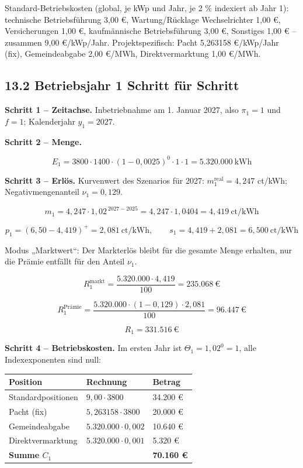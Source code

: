\documentclass[
  a4paper,
  10pt]{article}
\begin{document}
Standard-Betriebskosten (global, je kWp und Jahr, je 2 \% indexiert ab
Jahr 1): technische Betriebsführung 3,00 €, Wartung/Rücklage
Wechselrichter 1,00 €, Versicherungen 1,00 €, kaufmännische
Betriebsführung 3,00 €, Sonstiges 1,00 € -- zusammen 9,00 €/kWp/Jahr.
Projektspezifisch: Pacht 5,263158 €/kWp/Jahr (fix), Gemeindeabgabe 2,00
€/MWh, Direktvermarktung 1,00 €/MWh.

\hypertarget{betriebsjahr-1-schritt-fuxfcr-schritt}{%
\subsection{13.2 Betriebsjahr 1 Schritt für
Schritt}\label{betriebsjahr-1-schritt-fuxfcr-schritt}}

\textbf{Schritt 1 -- Zeitachse.} Inbetriebnahme am 1. Januar 2027, also
\(\pi_1 = 1\) und \(f = 1\); Kalenderjahr \(y_1 = 2027\).

\textbf{Schritt 2 -- Menge.}

\[ E_1 = 3800 \cdot 1400 \cdot (1-0{,}0025)^0 \cdot 1 \cdot 1 = 5.320.000\ \mathrm{kWh} \]

\textbf{Schritt 3 -- Erlös.} Kurvenwert des Szenarios für 2027:
\(m^{\mathrm{real}}_1 = 4{,}247\) ct/kWh; Negativmengenanteil
\(\nu_1 = 0{,}129\).

\[ m_1 = 4{,}247 \cdot 1{,}02^{\,2027-2025} = 4{,}247 \cdot 1{,}0404 = 4{,}419\ \text{ct/kWh} \]

\[ p_1 = (6{,}50 - 4{,}419)^{+} = 2{,}081\ \text{ct/kWh}, \qquad s_1 = 4{,}419 + 2{,}081 = 6{,}500\ \text{ct/kWh} \]

Modus „Marktwert``: Der Markterlös bleibt für die gesamte Menge
erhalten, nur die Prämie entfällt für den Anteil \(\nu_1\).

\[ R^{\mathrm{markt}}_1 = \frac{5.320.000 \cdot 4{,}419}{100} = 235.068\ \text{€} \]

\[ R^{\text{Prämie}}_1 = \frac{5.320.000 \cdot (1 - 0{,}129) \cdot 2{,}081}{100} = 96.447\ \text{€} \]

\[ R_1 = 331.516\ \text{€} \]

\textbf{Schritt 4 -- Betriebskosten.} Im ersten Jahr ist
\(\Theta_1 = 1{,}02^0 = 1\), alle Indexexponenten sind null:

\begin{longtable}[]{@{}lll@{}}
\toprule\noalign{}
Position & Rechnung & Betrag \\
\midrule\noalign{}
\endhead
\bottomrule\noalign{}
\endlastfoot
Standardpositionen & \(9{,}00 \cdot 3800\) & 34.200 € \\
Pacht (fix) & \(5{,}263158 \cdot 3800\) & 20.000 € \\
Gemeindeabgabe & \(5.320.000 \cdot 0{,}002\) & 10.640 € \\
Direktvermarktung & \(5.320.000 \cdot 0{,}001\) & 5.320 € \\
\textbf{Summe \(C_1\)} & & \textbf{70.160 €} \\
\end{longtable}
\end{document}
